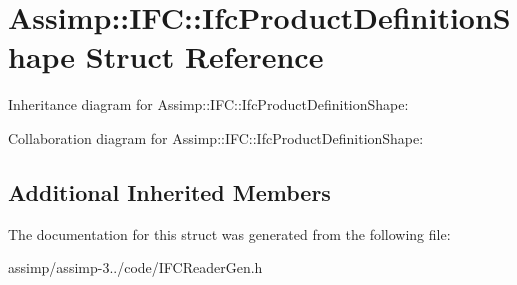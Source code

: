 \hypertarget{struct_assimp_1_1_i_f_c_1_1_ifc_product_definition_shape}{\section{Assimp\+:\+:I\+F\+C\+:\+:Ifc\+Product\+Definition\+Shape Struct Reference}
\label{struct_assimp_1_1_i_f_c_1_1_ifc_product_definition_shape}
}


Inheritance diagram for Assimp\+:\+:I\+F\+C\+:\+:Ifc\+Product\+Definition\+Shape\+:


Collaboration diagram for Assimp\+:\+:I\+F\+C\+:\+:Ifc\+Product\+Definition\+Shape\+:
\subsection*{Additional Inherited Members}


The documentation for this struct was generated from the following file\+:\begin{DoxyCompactItemize}
\item 
assimp/assimp-\/3../code/I\+F\+C\+Reader\+Gen.\+h\end{DoxyCompactItemize}
